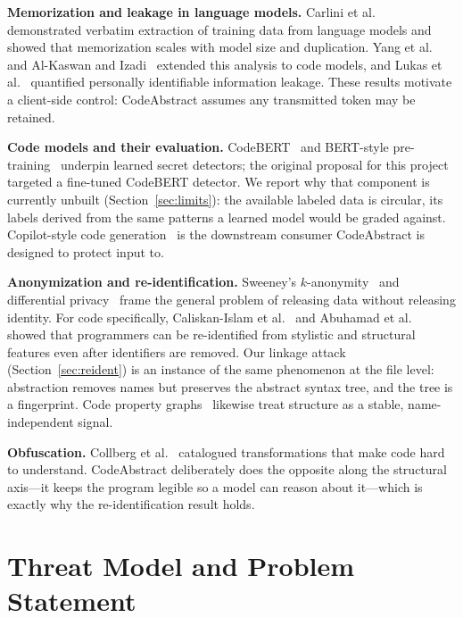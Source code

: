\documentclass[conference]{IEEEtran}
\begin{document}
\textbf{Memorization and leakage in language models.} Carlini et
al.~\cite{carlini2021extracting,carlini2023quantifying} demonstrated
verbatim extraction of training data from language models and showed that
memorization scales with model size and duplication. Yang et
al.~\cite{yang2024memorization} and Al-Kaswan and
Izadi~\cite{alkaswan2023abuse} extended this analysis to code models, and
Lukas et al.~\cite{lukas2023analyzing} quantified personally identifiable
information leakage. These results motivate a client-side control:
CodeAbstract assumes any transmitted token may be retained.

\textbf{Code models and their evaluation.}
CodeBERT~\cite{feng2020codebert} and BERT-style
pre-training~\cite{devlin2019bert} underpin learned secret detectors; the
original proposal for this project targeted a fine-tuned CodeBERT
detector. We report why that component is currently unbuilt
(Section~\ref{sec:limits}): the available labeled data is circular, its
labels derived from the same patterns a learned model would be graded
against. Copilot-style code
generation~\cite{chen2021codex,pearce2022asleep,hou2024llmse} is the
downstream consumer CodeAbstract is designed to protect input to.

\textbf{Anonymization and re-identification.} Sweeney's
$k$-anonymity~\cite{sweeney2002kanon} and differential
privacy~\cite{dwork2006differential} frame the general problem of
releasing data without releasing identity. For code specifically,
Caliskan-Islam et al.~\cite{caliskan2015deanon} and Abuhamad et
al.~\cite{abuhamad2018authorship} showed that programmers can be
re-identified from stylistic and structural features even after
identifiers are removed. Our linkage attack (Section~\ref{sec:reident}) is
an instance of the same phenomenon at the file level: abstraction removes
names but preserves the abstract syntax tree, and the tree is a
fingerprint. Code property graphs~\cite{yamaguchi2014cpg} likewise treat
structure as a stable, name-independent signal.

\textbf{Obfuscation.} Collberg et al.~\cite{collberg1997taxonomy}
catalogued transformations that make code hard to understand. CodeAbstract
deliberately does the opposite along the structural axis---it keeps the
program legible so a model can reason about it---which is exactly why the
re-identification result holds.

\section{Threat Model and Problem Statement}
\label{sec:threat}
\end{document}
